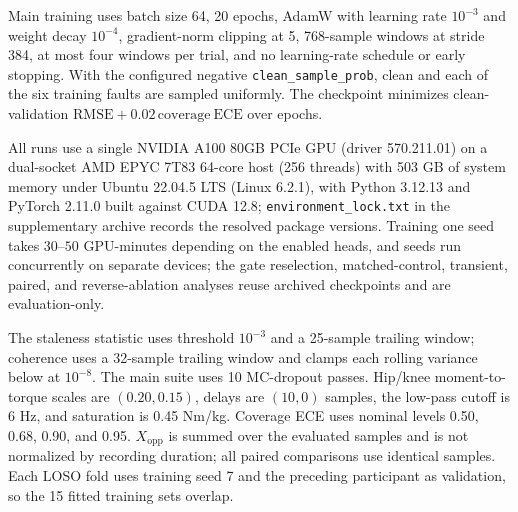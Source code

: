 \documentclass[letterpaper]{article}
\begin{document}
Main training uses batch size 64, 20 epochs, AdamW with learning rate
$10^{-3}$ and weight decay $10^{-4}$, gradient-norm clipping at 5, 768-sample
windows at stride 384, at most four windows per trial, and no learning-rate
schedule or early stopping. With the configured negative
\texttt{clean\_sample\_prob}, clean and each of the six training faults are
sampled uniformly. The checkpoint minimizes clean-validation
$\mathrm{RMSE}+0.02\,\mathrm{coverage\ ECE}$ over epochs.

All runs use a single NVIDIA A100 80GB PCIe GPU (driver 570.211.01) on a
dual-socket AMD EPYC 7T83 64-core host (256 threads) with 503 GB of system
memory under Ubuntu 22.04.5 LTS (Linux 6.2.1), with Python 3.12.13 and PyTorch
2.11.0 built against CUDA 12.8; \texttt{environment\_lock.txt} in the
supplementary archive records the resolved package versions. Training
one seed takes $30$--$50$ GPU-minutes depending on the enabled heads, and seeds
run concurrently on separate devices; the gate reselection, matched-control,
transient, paired, and reverse-ablation analyses reuse archived checkpoints and
are evaluation-only.

The staleness statistic uses threshold $10^{-3}$ and a 25-sample trailing
window; coherence uses a 32-sample trailing window and clamps each rolling
variance below at $10^{-8}$. The main suite uses 10 MC-dropout passes.
Hip/knee moment-to-torque scales are $(0.20,0.15)$, delays are $(10,0)$ samples,
the low-pass cutoff is 6 Hz, and saturation is 0.45 Nm/kg. Coverage ECE uses
nominal levels 0.50, 0.68, 0.90, and 0.95. $X_{\mathrm{opp}}$ is summed over
the evaluated samples and is not normalized by recording duration; all paired
comparisons use identical samples. Each LOSO fold uses training seed 7 and the
preceding participant as validation, so the 15 fitted training sets overlap.
\end{document}
